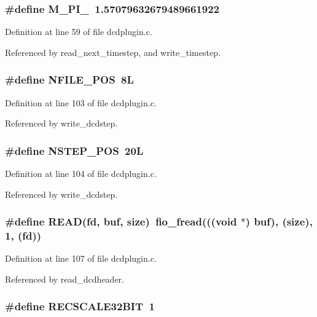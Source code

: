 \subsubsection{\setlength{\rightskip}{0pt plus 5cm}\#define M\_\-PI\_\ 1.57079632679489661922}\label{dcdplugin_8c_a0}




Definition at line 59 of file dcdplugin.c.

Referenced by read\_\-next\_\-timestep, and write\_\-timestep.
\subsubsection{\setlength{\rightskip}{0pt plus 5cm}\#define NFILE\_\-POS\ 8L}\label{dcdplugin_8c_a18}




Definition at line 103 of file dcdplugin.c.

Referenced by write\_\-dcdstep.
\subsubsection{\setlength{\rightskip}{0pt plus 5cm}\#define NSTEP\_\-POS\ 20L}\label{dcdplugin_8c_a19}




Definition at line 104 of file dcdplugin.c.

Referenced by write\_\-dcdstep.
\subsubsection{\setlength{\rightskip}{0pt plus 5cm}\#define READ(fd, buf, size)\ fio\_\-fread(((void $\ast$) buf), (size), 1, (fd))}\label{dcdplugin_8c_a20}




Definition at line 107 of file dcdplugin.c.

Referenced by read\_\-dcdheader.
\subsubsection{\setlength{\rightskip}{0pt plus 5cm}\#define RECSCALE32BIT\ 1}\label{dcdplugin_8c_a1}




